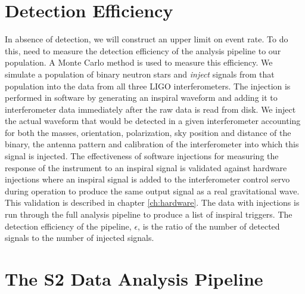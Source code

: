 \section{Detection Efficiency}
\label{s:eff}

In absence of detection, we will construct an upper limit on event rate.  To
do this, need to measure the detection efficiency of the analysis pipeline to
our population. A Monte Carlo method is used to measure this efficiency. We
simulate a population of binary neutron stars and \emph{inject} signals from
that population into the data from all three LIGO interferometers. The
injection is performed in software by generating an inspiral waveform and
adding it to interferometer data immediately after the raw data is read from
disk. We inject the actual waveform that would be detected in a given
interferometer accounting for both the masses, orientation, polarization, sky
position and distance of the binary, the antenna pattern and calibration of
the interferometer into which this signal is injected.  The effectiveness of
software injections for measuring the response of the instrument to an
inspiral signal is validated against hardware injections where
an inspiral signal is added to the interferometer control servo during
operation to produce the same output signal as a real gravitational wave. This
validation is described in chapter \ref{ch:hardware}. The
data with injections is run through the full analysis pipeline to produce a
list of inspiral triggers. The detection efficiency of the pipeline,
$\epsilon$, is the ratio of the number of detected signals to the number of
injected signals.

\section{The S2 Data Analysis Pipeline}
\label{s:s2pipeline}

